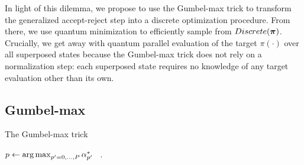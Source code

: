 \documentclass[12pt]{article} %
\newcommand{\argmax}{\operatornamewithlimits{arg\,max}}
\begin{document}
 In light of this dilemma, we propose to use the Gumbel-max trick \citep{papandreou2011perturb} to transform the generalized accept-reject step into a discrete optimization procedure.  From there, we use quantum minimization to efficiently sample from $Discrete(\boldsymbol{\pi})$. Crucially, we get away with quantum parallel evaluation of the target $\pi(\cdot)$ over all superposed states because the Gumbel-max trick does not rely on a normalization step: each superposed state requires no knowledge of any target evaluation other than its own.  

\subsection{Gumbel-max}\label{sec:gm}
\newcommand{\p}{\mbox{p}}

\begin{algorithm}[!t]
	\caption{The Gumbel-max trick}\label{alg:gm}
	$p \gets \argmax_{p'=0,\dots,P}\alpha^*_{p'}$\;
	\ .
	
	\vspace{0.5em}
\end{algorithm}
\end{document}
